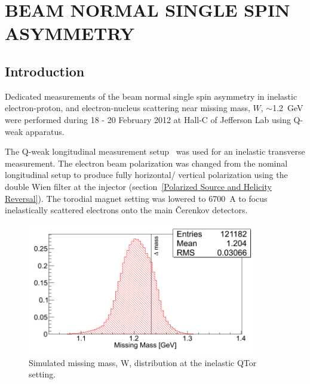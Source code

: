 \chapter{BEAM NORMAL SINGLE SPIN ASYMMETRY}
\label{BEAM NORMAL SINGLE SPIN ASYMMETRY}

\section{Introduction}
\label{Introduction}

Dedicated measurements of the beam normal single spin asymmetry in inelastic electron-proton, and electron-nucleus scattering near missing mass, $W$, $\sim$1.2~GeV were performed during 18 - 20 February 2012 at Hall-C of Jefferson Lab using Q-weak apparatus. 

%
The Q-weak longitudinal measurement setup~\cite{qweak_proposal_2007} was used for an inelastic transverse measurement. The electron beam polarization was changed from the nominal longitudinal setup to produce fully horizontal/ vertical polarization using the double Wien filter at the injector (section~\ref{Polarized Source and Helicity Reversal}). The torodial magnet setting was lowered to 6700~A to focus inelastically scattered electrons onto the main \v{C}erenkov detectors. 


\begin{figure}[!h]
	\begin{center}
	\includegraphics[width=10.0cm]{figures/W_G3}
	\end{center}
	\caption
	{Simulated missing mass, W, distribution at the inelastic QTor setting.}
	\label{fig:W_G3}
\end{figure}

